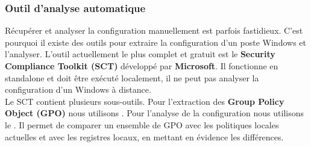 \documentclass[twoside,a4paper,12pt,titlepage]{book}
\begin{document}
\subsubsection{Outil d'analyse automatique}
Récupérer et analyser la configuration manuellement est parfois fastidieux. C'est pourquoi il existe des outils pour extraire la configuration d'un poste Windows et l'analyser. L'outil actuellement le plus complet et gratuit est le \textbf{Security Compliance Toolkit (SCT)} développé par \textbf{Microsoft}. Il fonctionne en standalone et doit être exécuté localement, il ne peut pas analyser la configuration d'un Windows à distance.\\
Le SCT contient plusieurs sous-outils. Pour l'extraction des \textbf{Group Policy Object (GPO)} nous utilisons . Pour l'analyse de la configuration nous utilisons le . Il permet de comparer un ensemble de GPO avec les politiques locales actuelles et avec les registres locaux, en mettant en évidence les différences.

\end{document}
